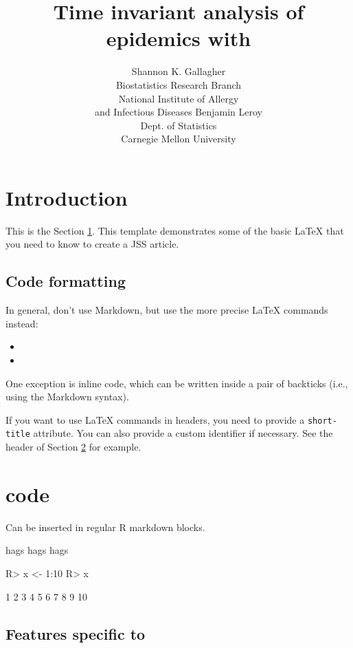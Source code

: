 \documentclass[
]{jss}
\author{
Shannon K. Gallagher\\Biostatistics Research Branch\\
National Institute of Allergy\\
and Infectious Diseases \And Benjamin Leroy\\Dept. of Statistics\\
Carnegie Mellon University
}
\title{Time invariant analysis of epidemics with \pkg{EpiCompare}}
\begin{document}
\section{Introduction}\label{sec:intro}

This is the Section \ref{sec:intro}. This template demonstrates some of
the basic LaTeX that you need to know to create a JSS article.

\hypertarget{code-formatting}{%
\subsection{Code formatting}\label{code-formatting}}

In general, don't use Markdown, but use the more precise LaTeX commands
instead:

\begin{itemize}
\item
\item
\end{itemize}

One exception is inline code, which can be written inside a pair of
backticks (i.e., using the Markdown syntax).

If you want to use LaTeX commands in headers, you need to provide a
\texttt{short-title} attribute. You can also provide a custom identifier
if necessary. See the header of Section \ref{r-code} for example.

\section[R code]{ code}\label{r-code}

Can be inserted in regular R markdown blocks.

hags hags hags \cite{Neal2004}

\begin{CodeChunk}
\begin{CodeInput}
R> x <- 1:10
R> x
\end{CodeInput}
\begin{CodeOutput}
 [1]  1  2  3  4  5  6  7  8  9 10
\end{CodeOutput}
\end{CodeChunk}

\subsection[Features specific to rticles]{Features specific to
}\label{features-specific-to}
\end{document}
